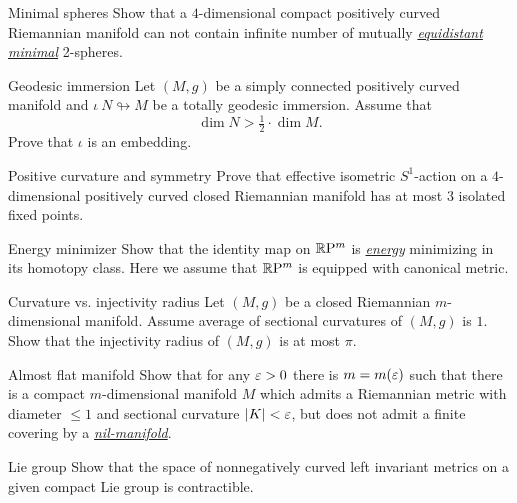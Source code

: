 \documentclass[twoside]{book}
\begin{document}
\begin{pr}{}{Minimal spheres}\label{Minimal spheres}
Show that a 
$4$-dimensional
compact 
positively curved 
Riemannian manifold 
can not contain infinite number of  mutually
 \hyperref[Equidistant subsets]{\emph{equidistant}} \hyperref[Minimal surface]{\emph{minimal}} 2-spheres.
\end{pr}

\begin{pr}{\hard}{Geodesic immersion}
\label{Geodesic immersion}
Let $(M,g)$ be a simply connected positively curved manifold and $\iota\:N\looparrowright M$ be a totally geodesic immersion.
Assume that 
\[\dim N>\tfrac 12\cdot \dim M.\]
Prove that $\iota$ is an embedding.
\end{pr}


\begin{pr}{\thm}{Positive curvature and symmetry}\label{kleiner-hopf} 
Prove that effective isometric $S^1$-action 
on a $4$-dimensional positively curved closed Riemannian manifold  
has at most $3$ isolated fixed points.
\end{pr}

\begin{pr}{}{Energy minimizer}\label{Energy minimizer}
Show that the identity map on $\mathbb{R}\mathrm{P}^m$ is 
\hyperref[Energy functional]{\emph{energy}}
minimizing in its homotopy class.
Here we assume that $\mathbb{R}\mathrm{P}^m$ is equipped with canonical metric.
\end{pr}

\begin{pr}{\thm}{Curvature vs. injectivity radius}\label{scalar-curv} 
Let $(M,g)$ be a closed 
Riemannian $m$-dimensional manifold.
Assume average of sectional curvatures of $(M,g)$ is $1$. 
Show that the injectivity radius of $(M,g)$ is at most $\pi$.
\end{pr}

\begin{pr}{}{Almost flat manifold}\label{almost-flat}
Show that for any $\varepsilon>0$ there is $m=m(\varepsilon)$ such that there is a compact
$m$-dimensional manifold $M$ which admits a Riemannian metric with diameter $\le 1$ and sectional
curvature $|K|<\varepsilon$,
but does not admit a finite covering by a \hyperref[Nil-manifolds]{\emph{nil-manifold}}.
\end{pr}

\begin{pr}{\easy}{Lie group}\label{lie-nonneg}
Show that the space of nonnegatively curved left invariant metrics 
on a given compact Lie group is contractible.
\end{pr}
\end{document}
